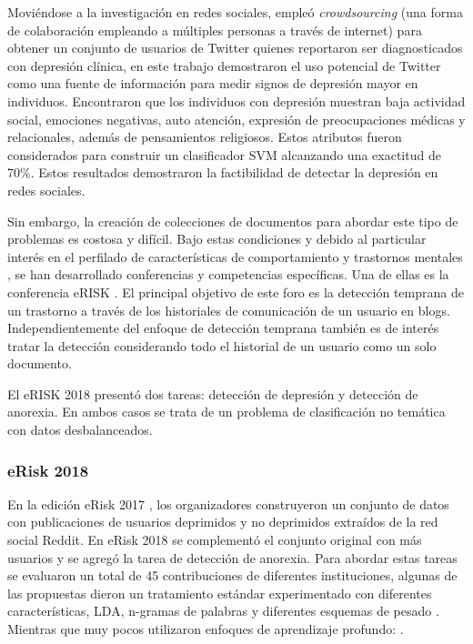 Moviéndose a la investigación en redes sociales, \citep{de2013predicting} empleó \textit{crowdsourcing} (una forma de colaboración empleando a múltiples personas a través de internet) para obtener un conjunto de usuarios de Twitter quienes reportaron ser diagnosticados con depresión clínica, en este trabajo demostraron el uso potencial de Twitter como una fuente de información para medir signos de depresión mayor en individuos. Encontraron que los individuos con depresión muestran baja actividad social, emociones negativas, auto atención, expresión de preocupaciones médicas y relacionales, además de pensamientos religiosos. Estos atributos fueron considerados para construir un clasificador SVM alcanzando una exactitud de 70\%. Estos resultados demostraron la factibilidad de detectar la depresión en redes sociales. 

Sin embargo, la creación de colecciones de documentos para abordar este tipo de problemas es costosa y difícil. Bajo estas condiciones y debido al particular interés en el perfilado de características de comportamiento \citep{kumar2018aggression} y trastornos mentales  \citep{de2013predicting}, se han desarrollado conferencias y competencias específicas.
Una de ellas es la conferencia eRISK \citep{Losada2018}. El principal objetivo de este foro es la detección temprana de un trastorno a través de los historiales de comunicación de un usuario en blogs. Independientemente del enfoque de detección temprana también es de interés tratar la detección
considerando todo el historial de un usuario como un solo documento. 

El eRISK 2018 presentó dos tareas: detección de depresión y detección de anorexia. En ambos casos se trata de un problema de clasificación no temática con datos desbalanceados.


\subsubsection{eRisk 2018}

En la edición eRisk 2017 \citep{losada2017erisk, Losada2018}, los organizadores construyeron un conjunto de datos con publicaciones de usuarios deprimidos y no deprimidos extraídos de la red social Reddit. En eRisk 2018 se complementó el conjunto original con más usuarios y se agregó la tarea de detección de anorexia. Para abordar estas tareas se evaluaron un total de 45 contribuciones de diferentes instituciones, algunas de las propuestas dieron un tratamiento estándar experimentado con diferentes características, LDA, n-gramas de palabras y diferentes esquemas de pesado \citep{cacheda2018analysis, almeida2017detecting, ortega2018peimex}. Mientras que muy pocos utilizaron enfoques de aprendizaje profundo: \citep{trotzek2018word, wang2018neural, liu2018tua1}.

